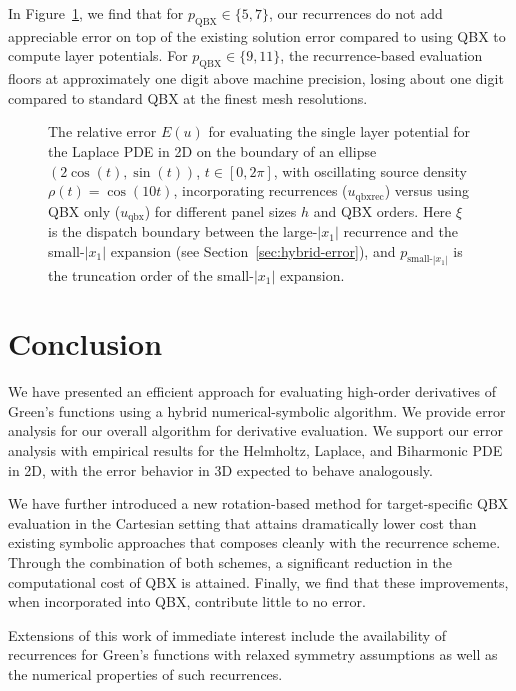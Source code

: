 \documentclass[12pt]{article}
\theoremstyle{definition}
\theoremstyle{plain}
\theoremstyle{definition}
\begin{document}
In Figure~\ref{figure:QBXLaplace}, we find that for $p_{\text{QBX}} \in \{5, 7\}$, our recurrences do not add appreciable error on top of the existing solution error compared to using QBX to compute layer potentials. For $p_{\text{QBX}} \in \{9, 11\}$, the recurrence-based evaluation floors at approximately one digit above machine precision, losing about one digit compared to standard QBX at the finest mesh resolutions.

\begin{figure}[h]
\centering

\caption{The relative error $E(u)$ for evaluating the single layer potential for the Laplace PDE in 2D on the boundary of an ellipse $(2\cos(t), \sin(t))$, $t \in [0, 2\pi]$, with oscillating source density $\rho(t)=\cos(10t)$, incorporating recurrences ($u_{\text{qbxrec}}$) versus using QBX only ($u_{\text{qbx}}$) for different panel sizes $h$ and QBX orders. Here $\xi$ is the dispatch boundary between the large-$|x_1|$ recurrence and the small-$|x_1|$ expansion (see Section~\ref{sec:hybrid-error}), and $p_{\text{small-$|x_1|$}}$ is the truncation order of the small-$|x_1|$ expansion.}
\label{figure:QBXLaplace}
\end{figure}
\section{Conclusion}
\label{sec:conclusions}

We have presented an efficient approach for evaluating high-order derivatives of Green's functions using a hybrid numerical-symbolic algorithm. We provide error analysis for our overall algorithm for derivative evaluation. We support our error analysis with empirical results for the Helmholtz, Laplace, and Biharmonic PDE in 2D, with the error behavior in 3D expected to behave analogously.

We have further introduced a new rotation-based method for target-specific QBX evaluation in the Cartesian setting that attains dramatically lower cost than existing symbolic approaches that composes cleanly with the recurrence scheme. Through the combination of both schemes, a significant reduction in the computational cost of QBX is attained. Finally, we find that these improvements, when incorporated into QBX, contribute little to no error.

Extensions of this work of immediate interest include the availability of recurrences for Green's functions with relaxed symmetry assumptions as well as the numerical properties of such recurrences.
\end{document}
